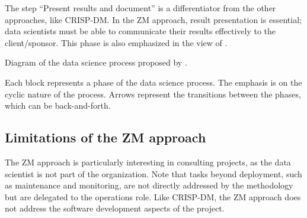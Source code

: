 The step ``Present results and document'' is a differentiator from the other approaches, like
CRISP-DM.  In the ZM approach, result presentation is essential; data scientists must be able
to communicate their results effectively to the client/sponsor.  This phase is also
emphasized in the view of \textcite{Wickham2023}.

\begin{figurebox}[label=fig:zumel]{Diagram of the data science process proposed by \textcite{Zumel2019}.}
  \centering

  \tcblower
  Each block represents a phase of the data science process.  The emphasis is on the
  cyclic nature of the process.  Arrows represent the transitions between the phases, which
  can be back-and-forth.
\end{figurebox}

\subsection{Limitations of the ZM approach}

The ZM approach is particularly interesting in consulting projects, as the data scientist
is not part of the organization.  Note that tasks beyond deployment, such as maintenance and
monitoring, are not directly addressed by the methodology but are delegated to the operations
role.  Like CRISP-DM, the ZM approach does not address the software development aspects of
the project.

